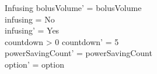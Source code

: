 \begin{schema}{Infusing}
	bolusVolume' = bolusVolume\\
	infusing = No\\
	infusing' = Yes\\
	countdown > 0 \land countdown' = 5\\
	powerSavingCount' = powerSavingCount\\ option' = option\\
\end{schema}

